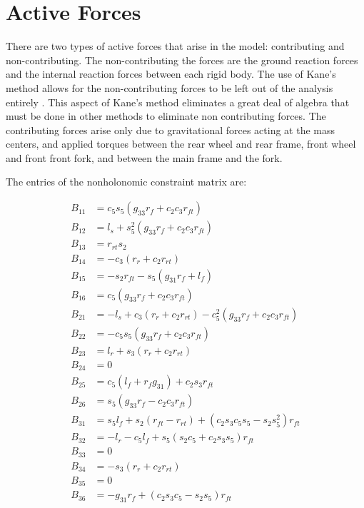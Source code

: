 \documentclass[letterpaper,11pt]{article}
\begin{document}
\section{Active Forces}

There are two types of active forces that arise in the model: contributing and
non-contributing.  The non-contributing the forces are the ground reaction
forces and the internal reaction forces between each rigid body.  The use of
Kane's method allows for the non-contributing forces to be left out of the
analysis entirely \cite{Kane1985}.  This aspect of Kane's method eliminates a
great deal of algebra that must be done in other methods to eliminate non
contributing forces.  The contributing forces arise only due to gravitational
forces acting at the mass centers, and applied torques between the rear wheel
and rear frame, front wheel and front front fork, and between the main frame
and the fork.


\appendix

The entries of the nonholonomic constraint matrix are:

\begin{align*}
  B_{11} & = c_5 s_5(g_{33} r_f + c_2 c_3 r_{ft}) \\
  B_{12} & = l_s + s_5^2(g_{33} r_f + c_2 c_3 r_{ft}) \\
  B_{13} & = r_{rt} s_2 \\
  B_{14} & = -c_3 (r_r + c_2 r_{rt}) \\
  B_{15} & =   -s_2 r_{ft} - s_5 (g_{31} r_f + l_f) \\
  B_{16} & = c_5(g_{33} r_f + c_2 c_3 r_{ft})\\
  B_{21} & = -l_s + c_3(r_r + c_2 r_{rt}) - c_5^2(g_{33} r_f + c_2 c_3 r_{ft})\\
  B_{22} & =  - c_5 s_5(g_{33} r_f + c_2 c_3 r_{ft}) \\
  B_{23} & = l_r + s_3 (r_r  + c_2 r_{rt}) \\
  B_{24} & = 0 \\
  B_{25} & = c_5 (l_f + r_f g_{31}) + c_2 s_3 r_{ft} \\
  B_{26} & = s_5(g_{33} r_f - c_2 c_3 r_{ft}) \\
  B_{31} & = s_5 l_f + s_2 (r_{ft} - r_{rt}) + (c_2 s_3 c_5 s_5 - s_2 s_5^2) r_{ft}\\
  B_{32} & =  -l_r - c_5 l_f + s_5 (s_2 c_5 + c_2 s_3 s_5) r_{ft} \\
  B_{33} & =  0 \\
  B_{34} & =  -s_3 (r_r + c_2 r_{rt}) \\
  B_{35} & =  0 \\
  B_{36} & =  -g_{31} r_f + (c_2 s_3 c_5 - s_2 s_5) r_{ft}
\end{align*}
\end{document}

